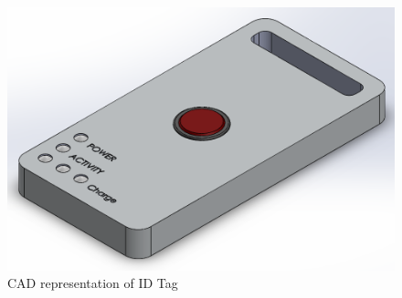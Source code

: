 \medskip
\begin{figure}[H]
\centering
    \includegraphics[scale=0.40]{./images/ID_Tag.png}
    \caption{CAD representation of ID Tag}
    \label{ID_Tag}
\end{figure}



\pagebreak
